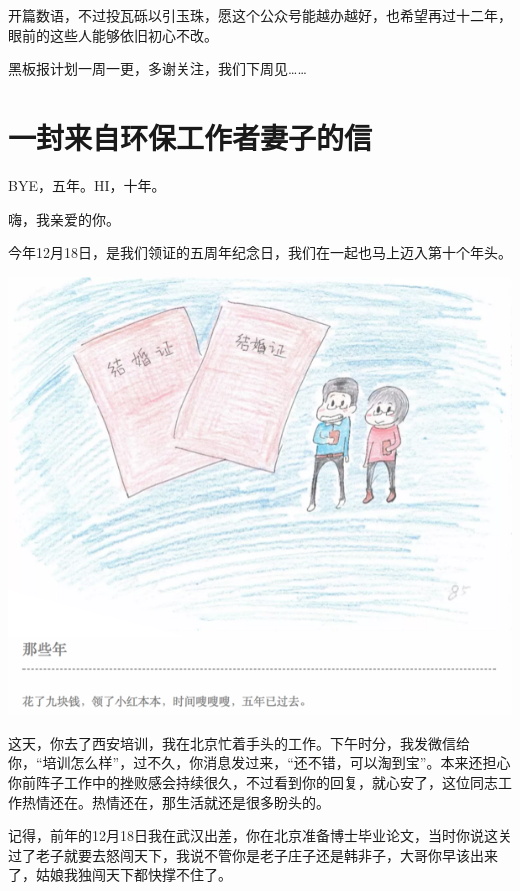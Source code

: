 \documentclass[]{book}
\begin{document}
开篇数语，不过投瓦砾以引玉珠，愿这个公众号能越办越好，也希望再过十二年，眼前的这些人能够依旧初心不改。

黑板报计划一周一更，多谢关注，我们下周见\ldots{}\ldots{}

\section{一封来自环保工作者妻子的信}

BYE，五年。HI，十年。

嗨，我亲爱的你。

今年12月18日，是我们领证的五周年纪念日，我们在一起也马上迈入第十个年头。

\includegraphics[width=8.33in]{images/wife1}

这天，你去了西安培训，我在北京忙着手头的工作。下午时分，我发微信给你，``培训怎么样''，过不久，你消息发过来，``还不错，可以淘到宝''。本来还担心你前阵子工作中的挫败感会持续很久，不过看到你的回复，就心安了，这位同志工作热情还在。热情还在，那生活就还是很多盼头的。

记得，前年的12月18日我在武汉出差，你在北京准备博士毕业论文，当时你说这关过了老子就要去怒闯天下，我说不管你是老子庄子还是韩非子，大哥你早该出来了，姑娘我独闯天下都快撑不住了。
\end{document}
